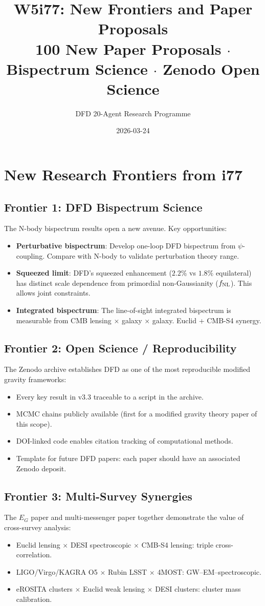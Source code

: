 \documentclass[11pt,a4paper]{article}
\title{W5i77: New Frontiers and Paper Proposals\\[6pt]
\large 100 New Paper Proposals $\cdot$ Bispectrum Science $\cdot$ Zenodo Open Science}
\author{DFD 20-Agent Research Programme}
\date{2026-03-24}
\begin{document}
\maketitle

\section{New Research Frontiers from i77}

\subsection{Frontier 1: DFD Bispectrum Science}
The N-body bispectrum results open a new avenue. Key opportunities:
\begin{itemize}[nosep]
\item \textbf{Perturbative bispectrum}: Develop one-loop DFD bispectrum from $\psi$-coupling. Compare with N-body to validate perturbation theory range.
\item \textbf{Squeezed limit}: DFD's squeezed enhancement ($2.2\%$ vs $1.8\%$ equilateral) has distinct scale dependence from primordial non-Gaussianity ($f_{\rm NL}$). This allows joint constraints.
\item \textbf{Integrated bispectrum}: The line-of-sight integrated bispectrum is measurable from CMB lensing $\times$ galaxy $\times$ galaxy. Euclid + CMB-S4 synergy.
\end{itemize}

\subsection{Frontier 2: Open Science / Reproducibility}
The Zenodo archive establishes DFD as one of the most reproducible modified gravity frameworks:
\begin{itemize}[nosep]
\item Every key result in v3.3 traceable to a script in the archive.
\item MCMC chains publicly available (first for a modified gravity theory paper of this scope).
\item DOI-linked code enables citation tracking of computational methods.
\item Template for future DFD papers: each paper should have an associated Zenodo deposit.
\end{itemize}

\subsection{Frontier 3: Multi-Survey Synergies}
The $E_G$ paper and multi-messenger paper together demonstrate the value of cross-survey analysis:
\begin{itemize}[nosep]
\item Euclid lensing $\times$ DESI spectroscopic $\times$ CMB-S4 lensing: triple cross-correlation.
\item LIGO/Virgo/KAGRA O5 $\times$ Rubin LSST $\times$ 4MOST: GW--EM--spectroscopic.
\item eROSITA clusters $\times$ Euclid weak lensing $\times$ DESI clusters: cluster mass calibration.
\end{itemize}
\end{document}
